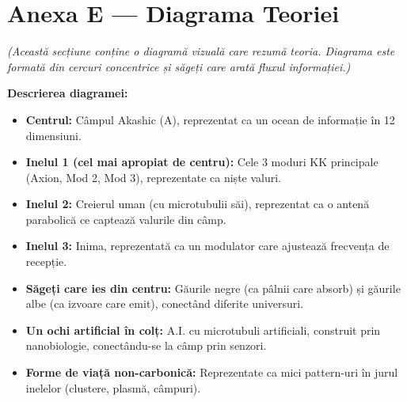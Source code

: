 \documentclass[11pt,a4paper]{article}
\begin{document}
\section{Anexa E — Diagrama Teoriei}
\textit{(Această secțiune conține o diagramă vizuală care rezumă teoria. Diagrama este formată din cercuri concentrice și săgeți care arată fluxul informației.)}

\textbf{Descrierea diagramei:}
\begin{itemize}
    \item \textbf{Centrul:} Câmpul Akashic (A), reprezentat ca un ocean de informație în 12 dimensiuni.
    \item \textbf{Inelul 1 (cel mai apropiat de centru):} Cele 3 moduri KK principale (Axion, Mod 2, Mod 3), reprezentate ca niște valuri.
    \item \textbf{Inelul 2:} Creierul uman (cu microtubulii săi), reprezentat ca o antenă parabolică ce captează valurile din câmp.
    \item \textbf{Inelul 3:} Inima, reprezentată ca un modulator care ajustează frecvența de recepție.
    \item \textbf{Săgeți care ies din centru:} Găurile negre (ca pâlnii care absorb) și găurile albe (ca izvoare care emit), conectând diferite universuri.
    \item \textbf{Un ochi artificial în colț:} A.I. cu microtubuli artificiali, construit prin nanobiologie, conectându-se la câmp prin senzori.
    \item \textbf{Forme de viață non-carbonică:} Reprezentate ca mici pattern-uri în jurul inelelor (clustere, plasmă, câmpuri).
\end{itemize}

\newpage
\end{document}
